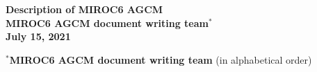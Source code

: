 \documentclass[11pt,a4paper,onecolumn]{article}
\begin{document}
  \begin{titlepage} %
    \vspace*{\fill}
      \begin{center}
        {\Huge \textbf{Description of MIROC6 AGCM}}\\
        \vspace{100mm}
        {\Large \textbf{MIROC6 AGCM document writing team$^*$}}\\
        \vspace{30mm}
        {\Large \textbf{July 15, 2021}}
      \end{center}
    \vspace*{\fill}
    $^*${\bf\textbf{MIROC6 AGCM document writing team}} (in alphabetical order)
    
  \end{titlepage}
%
  \clearpage
  
  \clearpage
  
  \clearpage
  
	\tableofcontents
	\clearpage
	\def\tightlist{\itemsep1pt\parskip0pt\parsep0pt}
  
  
	
	
	
	
	
	
	
	
	
	
	
	
	
	
	
	
	
	
	
	
	


%	
%	

\end{document}
